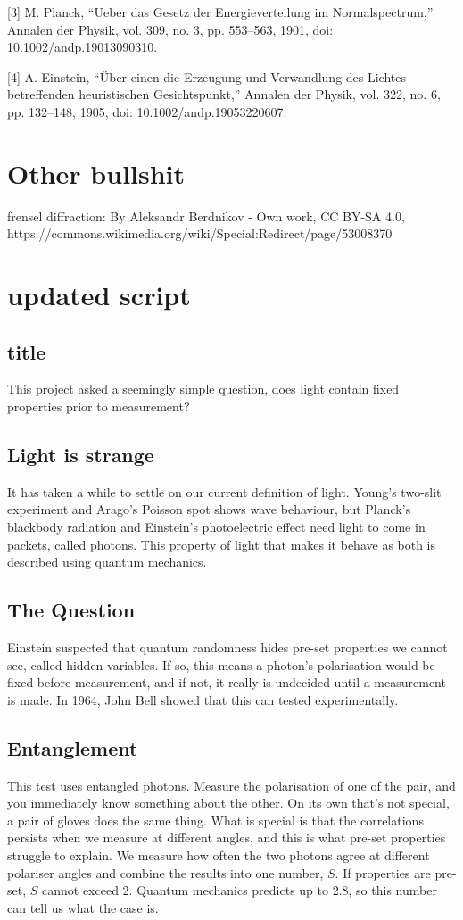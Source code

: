 \documentclass{article}
\begin{document}
[3] M. Planck, “Ueber das Gesetz der Energieverteilung im Normalspectrum,” Annalen der Physik, vol. 309, no. 3, pp. 553–563, 1901, doi: 10.1002/andp.19013090310.

[4] A. Einstein, “Über einen die Erzeugung und Verwandlung des Lichtes betreffenden heuristischen Gesichtspunkt,” Annalen der Physik, vol. 322, no. 6, pp. 132–148, 1905, doi: 10.1002/andp.19053220607.

\section{Other bullshit}
frensel diffraction: By Aleksandr Berdnikov - Own work, CC BY-SA 4.0, https://commons.wikimedia.org/wiki/Special:Redirect/page/53008370

\section{updated script}
\subsection{title}
This project asked a seemingly simple question, does light contain fixed properties prior to measurement?

\subsection{Light is strange}
It has taken a while to settle on our current definition of light. Young's two-slit experiment and Arago's Poisson spot shows wave behaviour, but Planck's blackbody radiation and Einstein's photoelectric effect need light to come in packets, called photons. This property of light that makes it behave as both is described using quantum mechanics.

\subsection{The Question}
Einstein suspected that quantum randomness hides pre-set properties we cannot see, called hidden variables. If so, this means a photon's polarisation would be fixed before measurement, and if not, it really is undecided until a measurement is made. In 1964, John Bell showed that this can tested experimentally.

\subsection{Entanglement}
This test uses entangled photons. Measure the polarisation of one of the pair, and you immediately know something about the other. On its own that's not special, a pair of gloves does the same thing. What is special is that the correlations persists when we measure at different angles, and this is what pre-set properties struggle to explain. We measure how often the two photons agree at different polariser angles and combine the results into one number, $S$. If properties are pre-set, $S$ cannot exceed 2. Quantum mechanics predicts up to 2.8, so this number can tell us what the case is.
\end{document}
